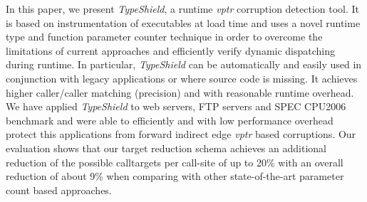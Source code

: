 
In this paper, we present \textit{TypeShield}, a runtime \textit{vptr} corruption
detection tool. It is based on instrumentation of executables at load time
and uses a novel runtime type and function parameter counter technique
in order to overcome the limitations of current approaches and efficiently
verify dynamic dispatching during runtime.
In particular, \textit{TypeShield} can be automatically and easily used
in conjunction with legacy applications or where source code is missing.
It achieves higher caller/caller matching (precision) and with reasonable
runtime overhead.
We have applied \textit{TypeShield} to
web servers, FTP servers and SPEC CPU2006 benchmark and were able to efficiently
and with low performance overhead protect this applications from forward indirect edge
\textit{vptr} based corruptions.
Our evaluation shows that our target reduction schema achieves an additional
reduction of the possible calltargets per call-site of up to 
20\% with an overall reduction of about 9\% when comparing with other state-of-the-art
parameter count based approaches.
